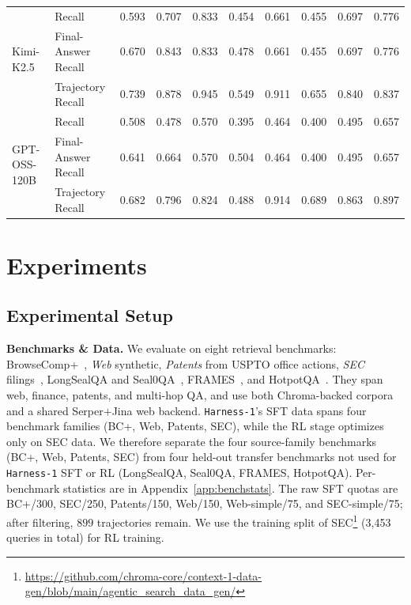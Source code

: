 \documentclass{article}
\newcommand{\sys}{\texttt{Harness-1}\xspace}
\begin{document}
\begin{table}[t]
{\begin{tabular}{llcccccccc}
\midrule
\multirow{3}{*}{Kimi-K2.5}
& Recall               & 0.593 & 0.707 & 0.833 & 0.454 & 0.661 & 0.455 & 0.697 & 0.776 \\
& Final-Answer Recall  & 0.670 & 0.843 & 0.833 & 0.478 & 0.661 & 0.455 & 0.697 & 0.776 \\
& Trajectory Recall    & 0.739 & 0.878 & 0.945 & 0.549 & 0.911 & 0.655 & 0.840 & 0.837 \\
\midrule
\multirow{3}{*}{GPT-OSS-120B}
& Recall               & 0.508 & 0.478 & 0.570 & 0.395 & 0.464 & 0.400 & 0.495 & 0.657 \\
& Final-Answer Recall  & 0.641 & 0.664 & 0.570 & 0.504 & 0.464 & 0.400 & 0.495 & 0.657 \\
& Trajectory Recall    & 0.682 & 0.796 & 0.824 & 0.488 & 0.914 & 0.689 & 0.863 & 0.897 \\
\bottomrule
\end{tabular}
}
\end{table}


\section{Experiments}
\subsection{Experimental Setup}
\label{sec:setup}

\textbf{Benchmarks \& Data.} We evaluate on eight retrieval benchmarks:
BrowseComp+~\cite{chen2025browsecompplus}, \emph{Web} synthetic,
\emph{Patents} from USPTO office actions, \emph{SEC} filings~\citep{bashir2026context1},
LongSealQA and Seal0QA~\cite{pham2025sealqa},
FRAMES~\cite{krishna2024frames}, and HotpotQA~\cite{yang2018hotpotqa}.
They span web, finance, patents, and multi-hop QA, and use both
Chroma-backed corpora and a shared Serper$+$Jina web backend.
\sys's SFT data spans four benchmark families (BC+, Web, Patents,
SEC), while the RL stage optimizes only on SEC data. We therefore
separate the four source-family benchmarks (BC+, Web, Patents, SEC)
from four held-out transfer benchmarks not used for \sys SFT or RL
(LongSealQA, Seal0QA, FRAMES, HotpotQA). Per-benchmark statistics are
in Appendix~\ref{app:benchstats}. The raw SFT quotas are BC+/300,
SEC/250, Patents/150, Web/150, Web-simple/75, and SEC-simple/75; after
filtering, $899$ trajectories remain. We use the training split of SEC\footnote{\url{https://github.com/chroma-core/context-1-data-gen/blob/main/agentic_search_data_gen/}} (3,453 queries in total) for RL training.
\end{document}
